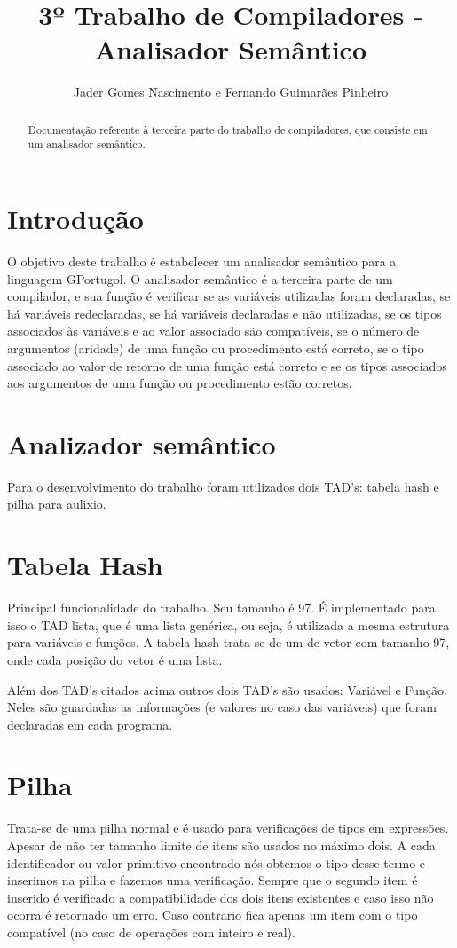 \documentclass[a4paper,10pt]{article}
\title{3º Trabalho de Compiladores - Analisador Semântico}
\author{Jader Gomes Nascimento e Fernando Guimarães Pinheiro}
\begin{document}
\maketitle

\begin{abstract}
Documentação referente à terceira parte do trabalho de compiladores, que consiste em um analisador semântico.
\end{abstract}

\section{Introdução}
O objetivo deste trabalho é estabelecer um analisador semântico para a linguagem GPortugol. O analisador semântico é a terceira parte
de um compilador, e sua função é verificar se as variáveis utilizadas foram declaradas, se há variáveis redeclaradas, se há variáveis declaradas e não utilizadas, se os tipos associados às variáveis e ao valor associado são compatíveis, se o número de argumentos (aridade) de uma função ou procedimento está correto, se o tipo associado ao valor de retorno de uma função está correto e se os tipos associados aos argumentos de uma função ou procedimento estão corretos.


\section{Analizador semântico}
Para o desenvolvimento do trabalho foram utilizados dois TAD's: tabela hash e pilha para aulixio.

\section{Tabela Hash}
Principal funcionalidade do trabalho. Seu tamanho é 97. É implementado para isso o TAD lista, que é uma lista genérica, ou seja, é utilizada a mesma estrutura para variáveis e funções.
A tabela hash trata-se de um de vetor com tamanho 97, onde cada posição do vetor é uma lista.

Além dos TAD's citados acima outros dois TAD's são usados: Variável e Função. Neles são guardadas as informações (e valores no caso das variáveis) que foram declaradas em cada programa.

\section{Pilha}
Trata-se de uma pilha normal e é usado para verificações de tipos em expressões.
Apesar de não ter tamanho limite de itens são usados no máximo dois. A cada identificador ou valor primitivo encontrado nós obtemos o tipo desse termo e inserimos na pilha e fazemos uma verificação. Sempre que o segundo item é inserido é verificado a compatibilidade dos dois itens existentes e caso isso não ocorra é retornado um erro. Caso contrario fica apenas um item com o tipo compatível (no caso de operações com inteiro e real).
\end{document}
